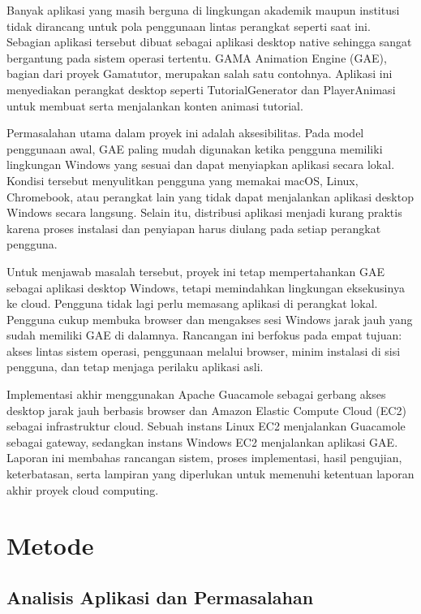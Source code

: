 \documentclass[conference]{IEEEtran}
\begin{document}
Banyak aplikasi yang masih berguna di lingkungan akademik maupun institusi tidak dirancang untuk pola penggunaan lintas perangkat seperti saat ini. Sebagian aplikasi tersebut dibuat sebagai aplikasi desktop native sehingga sangat bergantung pada sistem operasi tertentu. GAMA Animation Engine (GAE), bagian dari proyek Gamatutor, merupakan salah satu contohnya. Aplikasi ini menyediakan perangkat desktop seperti TutorialGenerator dan PlayerAnimasi untuk membuat serta menjalankan konten animasi tutorial.

Permasalahan utama dalam proyek ini adalah aksesibilitas. Pada model penggunaan awal, GAE paling mudah digunakan ketika pengguna memiliki lingkungan Windows yang sesuai dan dapat menyiapkan aplikasi secara lokal. Kondisi tersebut menyulitkan pengguna yang memakai macOS, Linux, Chromebook, atau perangkat lain yang tidak dapat menjalankan aplikasi desktop Windows secara langsung. Selain itu, distribusi aplikasi menjadi kurang praktis karena proses instalasi dan penyiapan harus diulang pada setiap perangkat pengguna.

Untuk menjawab masalah tersebut, proyek ini tetap mempertahankan GAE sebagai aplikasi desktop Windows, tetapi memindahkan lingkungan eksekusinya ke cloud. Pengguna tidak lagi perlu memasang aplikasi di perangkat lokal. Pengguna cukup membuka browser dan mengakses sesi Windows jarak jauh yang sudah memiliki GAE di dalamnya. Rancangan ini berfokus pada empat tujuan: akses lintas sistem operasi, penggunaan melalui browser, minim instalasi di sisi pengguna, dan tetap menjaga perilaku aplikasi asli.

Implementasi akhir menggunakan Apache Guacamole sebagai gerbang akses desktop jarak jauh berbasis browser dan Amazon Elastic Compute Cloud (EC2) sebagai infrastruktur cloud. Sebuah instans Linux EC2 menjalankan Guacamole sebagai gateway, sedangkan instans Windows EC2 menjalankan aplikasi GAE. Laporan ini membahas rancangan sistem, proses implementasi, hasil pengujian, keterbatasan, serta lampiran yang diperlukan untuk memenuhi ketentuan laporan akhir proyek cloud computing.

\section{Metode}

\subsection{Analisis Aplikasi dan Permasalahan}
\end{document}
